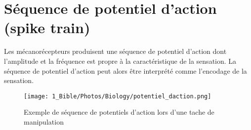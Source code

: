 \section{Séquence de potentiel d’action (spike train)}
Les mécanorécepteurs produisent une séquence de potentiel d’action dont l’amplitude et la fréquence est propre à la caractéristique de la sensation. La séquence de potentiel d’action peut alors être interprété comme l’encodage de la sensation.\par
\begin{figure}[!h]
	\centering
	\texttt{[image: 1\_Bible/Photos/Biology/potentiel\_daction.png]}
	\caption{Exemple de séquence de potentiels d'action lors d'une tache de manipulation}\label{potentiel_daction}
\end{figure}


